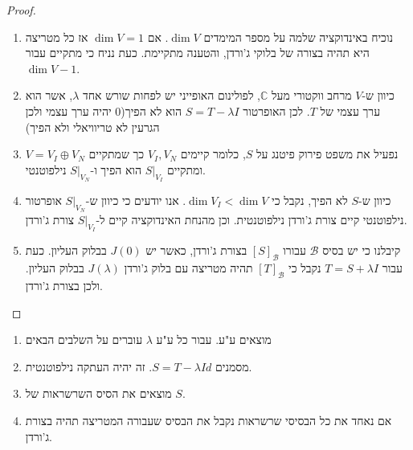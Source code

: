 \documentclass{tstextbook}
\begin{document}
\begin{proof}
  \begin{enumerate}
    \item נוכיח באינדוקציה שלמה על מספר המימדים \(\dim V\). אם \(\dim V=1\) אז כל מטריצה היא תהיה בצורה של בלוקי ג'ורדן, והטענה מתקיימת. כעת נניח כי מתקיים עבור \(\dim V-1\).  


    \item כיוון ש-\(V\) מרחב ווקטורי מעל \(\mathbb{C}\), לפולינום האופייני יש לפחות שורש אחד \(\lambda\), אשר הוא ערך עצמי של \(T\). לכן האופרטור \(S=T-\lambda I\) הוא לא הפיך(0 יהיה ערך עצמי ולכן הגרעין לא טריוויאלי ולא הפיך) 


    \item נפעיל את משפט פירוק פיטנג על \(S\), כלומר קיימים \(V_{I},V_{N}\) כך שמתקיים \(V=V_{I}\oplus V_{N}\) ומתקיים \(S|_{V_{I}}\) הוא הפיך ו-\(S|_{V_{N}}\) נילפוטנטי. 


    \item כיוון ש-\(S\) לא הפיך, נקבל כי \(\dim V_{I}<\dim V\). אנו יודעים כי כיוון ש-\(S|_{V_{N}}\) אופרטור נילפוטנטי קיים צורת ג'ורדן נילפוטנטית. וכן מהנחת האינדוקציה קיים ל-\(S|_{V_{I}}\) צורת ג'ורדן.  


    \item קיבלנו כי יש בסיס \(\mathcal{ B}\) עבורו \([S]_{\mathcal{B}}\) בצורת ג'ורדן, כאשר יש \(J(0)\) בבלוק העליון. כעת עבור \(T=S+\lambda I\) נקבל כי \([T]_{\mathcal{ B}}\) תהיה מטריצה עם בלוק ג'ורדן \(J\left( \lambda\right)\) בבלוק העליון. ולכן בצורת ג'ורדן. 


  \end{enumerate}
\end{proof}
\begin{corollary}
  \begin{enumerate}
    \item מוצאים ע"ע. עבור כל ע"ע \(\lambda\) עוברים על השלבים הבאים 


    \item מסמנים \(S=T-\lambda Id\). זה יהיה העתקה נילפוטנטית. 


    \item מוצאים את הסיס השרשראות של \(S\). 


    \item אם נאחד את כל הבסיסי שרשראות נקבל את הבסיס שעבורה המטריצה תהיה בצורת ג'ורדן. 


  \end{enumerate}
\end{corollary}
\end{document}
